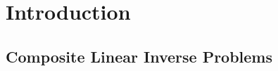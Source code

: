 \documentclass[12pt]{article}
\begin{document}
\section{Introduction}
    

    \subsection{Composite Linear Inverse Problems}
    
\end{document}

